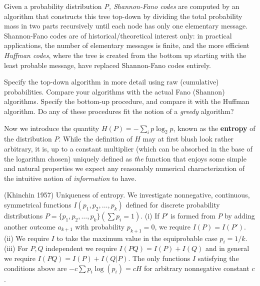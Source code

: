 \smallskip\noindent
Given a probability distribution {\it P, Shannon-Fano codes} are computed by
an algorithm that constructs this tree top-down by dividing the total
probability mass in two parts recursively until each node has only one
elementary message.  Shannon-Fano codes are of historical/theoretical interest
only: in practical applications, the number of elementary messages is finite,
and the more efficient {\it Huffman codes}, where the tree is created from the
bottom up starting with the least probable message, have replaced Shannon-Fano
codes entirely.  

\smallskip{} Specify the top-down algorithm in more
detail using raw (cumulative) probabilities. Compare your algorithms with the
actual Fano (Shannon) algorithms. Specify the bottom-up procedure, and compare
it with the Huffman algorithm. Do any of these procedures fit the notion of a
{\it greedy} algorithm?

\smallskip\noindent
Now we introduce the quantity $H(P)=-\sum_i p \log_2 p$, known as the {\bf
entropy}  of the distribution $P$. While the definition
of $H$ may at first blush look rather arbitrary, it is, up to a constant
multiplier (which can be absorbed in the base of the logarithm chosen)
uniquely defined as {\it the} function that enjoys some simple and natural
properties we expect any reasonably numerical characterization of the
intuitive notion of {\it information} to have.

\smallskip{} (Khinchin 1957) Uniqueness of
entropy. We investigate nonnegative, continuous, symmetrical functions $I(p_1,
p_2,\ldots,p_k)$ defined for discrete probability distributions
$P=\{p_1,p_2,\ldots,p_k\} (\sum p_i =1)$. (i) If $P'$ is formed from $P$ by
adding another outcome $a_{k+1}$ with probability $p_{k+1}=0$, we require
$I(P)=I(P')$. (ii) We require $I$ to take the maximum value in the equiprobable
case $p_i=1/k$.  (iii) For $P,Q$ independent we require $I(PQ) = I(P)+I(Q)$
and in general we require $I(PQ) = I(P)+I(Q|P).$ The only functions $I$
satisfying the conditions above are $-c\sum p_i \log(p_i)=cH$ for arbitrary
nonnegative constant $c$.\nocite{Khinchin:1957}


